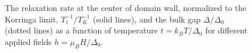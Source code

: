 \documentclass[prb,aps,showpacs,amsmath,twocolumn,10pt]{revtex4-1}
\newcommand{\blue}{\textcolor{blue}}
\newcommand{\red}{\textcolor{red}}
\begin{document}
\begin{figure}
\hfill
{}
\caption{
\quad The relaxation rate at the center of domain wall, 
normalized to the Korringa limit, $T_1^{-1} / T_K^{-1}$ (solid lines), 
and the bulk gap $\Delta/\Delta_0$ (dotted lines) as a function of temperature $t = k_B T/\Delta_0$ 
for different applied fields $h = \mu_B H/\Delta_0$. 
}
\end{figure}
\end{document}

